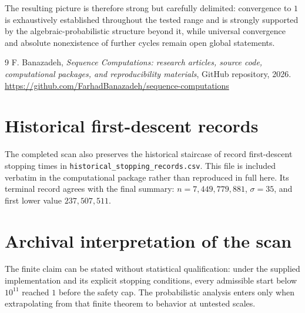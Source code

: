 \documentclass[11pt]{article}
\begin{document}
The resulting picture is therefore strong but carefully delimited: convergence to $1$ is exhaustively established throughout the tested range and is strongly supported by the algebraic-probabilistic structure beyond it, while universal convergence and absolute nonexistence of further cycles remain open global statements.

\begin{thebibliography}{9}
F. Banazadeh, \emph{Sequence Computations: research articles, source code, computational packages, and reproducibility materials}, GitHub repository, 2026.\\
\url{https://github.com/FarhadBanazadeh/sequence-computations}
\end{thebibliography}

\appendix
\section{Historical first-descent records}
The completed scan also preserves the historical staircase of record first-descent stopping times in \texttt{historical\_stopping\_records.csv}. This file is included verbatim in the computational package rather than reproduced in full here. Its terminal record agrees with the final summary: $n=7,449,779,881$, $\sigma=35$, and first lower value $237,507,511$.

\section{Archival interpretation of the scan}
The finite claim can be stated without statistical qualification: under the supplied implementation and its explicit stopping conditions, every admissible start below $10^{11}$ reached $1$ before the safety cap. The probabilistic analysis enters only when extrapolating from that finite theorem to behavior at untested scales.
\end{document}
